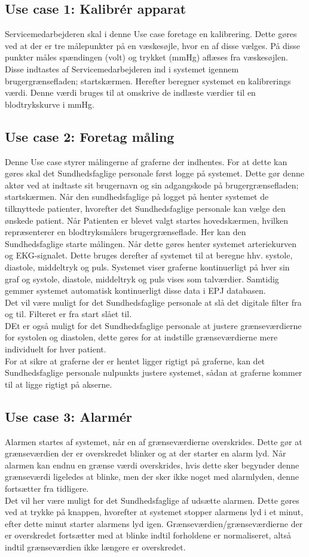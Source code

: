 \subsection{Use case 1: Kalibrér apparat}
Servicemedarbejderen skal i denne Use case foretage en kalibrering. Dette gøres ved at der er tre målepunkter på en væskesøjle, hvor en af disse vælges. På disse punkter måles spændingen (volt) og trykket (mmHg) aflæses fra væskesøjlen. Disse indtastes af Servicemedarbejderen ind i systemet igennem brugergrænsefladen; startskærmen. Herefter beregner systemet en kalibrerings værdi. Denne værdi bruges til at omskrive de indlæste værdier til en blodtrykskurve i mmHg.
\subsection{Use case 2: Foretag måling}
Denne Use case styrer målingerne af graferne der indhentes. For at dette kan gøres skal det Sundhedsfaglige personale først logge på systemet. Dette gør denne aktør ved at indtaste sit brugernavn og sin adgangskode på brugergrænsefladen; startskærmen. Når den sundhedsfaglige på logget på henter systemet de tilknyttede patienter, hvorefter det Sundhedsfaglige personale kan vælge den ønskede patient. Når Patienten er blevet valgt startes hovedskærmen, hvilken repræsenterer en blodtryksmålers brugergrænseflade. Her kan den Sundhedsfaglige starte målingen. Når dette gøres henter systemet arteriekurven og EKG-signalet. Dette bruges derefter af systemet til at beregne hhv. systole, diastole, middeltryk og puls. Systemet viser graferne kontinuerligt på hver sin graf og systole, diastole, middeltryk og puls vises som talværdier. Samtidig gemmer systemet automatisk kontinuerligt disse data i EPJ databasen. \\
Det vil være muligt for det Sundhedsfaglige personale at slå det digitale filter fra og til. Filteret er fra start slået til.\\
DEt er også muligt for det Sundhedsfaglige personale at justere grænseværdierne for systolen og diastolen, dette gøres for at indstille grænseværdierne mere individuelt for hver patient.\\
For at sikre at graferne der er hentet ligger rigtigt på graferne, kan det Sundhedsfaglige personale nulpunkts justere systemet, sådan at graferne kommer til at ligge rigtigt på akserne.
\subsection{Use case 3: Alarmér}
Alarmen startes af systemet, når en af grænseværdierne overskrides. Dette gør at grænseværdien der er overskredet blinker og at der starter en alarm lyd. Når alarmen kan endnu en grænse værdi overskrides, hvis dette sker begynder denne grænseværdi ligeledes at blinke, men der sker ikke noget med alarmlyden, denne fortsætter fra tidligere. \\
Det vil her være muligt for det Sundhedsfaglige af udsætte alarmen. Dette gøres ved at trykke på knappen, hvorefter at systemet stopper alarmens lyd i et minut, efter dette minut starter alarmens lyd igen. Grænseværdien/grænseværdierne der er overskredet fortsætter med at blinke indtil forholdene er normaliseret, altså indtil grænseværdien ikke længere er overskredet.
